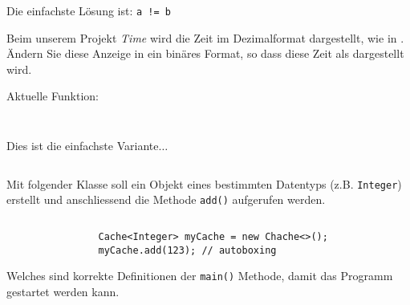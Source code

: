 \documentclass[12pt,a4paper]{exam}
\begin{document}
\begin{questions}
        \ifprintanswers
        \begin{solution}
            Die einfachste Lösung ist:
            \texttt{a != b}
        \end{solution}
        \else\makeemptybox{2in}
        \fi


        \question[10] Beim unserem Projekt \emph{Time} wird die Zeit im Dezimalformat
        dargestellt, wie in . Ändern Sie diese Anzeige in ein binäres
        Format, so dass diese Zeit als  dargestellt wird.

        Aktuelle Funktion:

        \inputminted[autogobble,firstline=75,lastline=78]
        {java}{../java/time/Display.java}

        \inputminted[autogobble,firstline=41,lastline=47]
        {java}{../java/time/NumberDisplay.java}


        \addpoints

        \ifprintanswers
        \begin{solution}
            Dies ist die einfachste Variante$\ldots$

            \inputminted[autogobble,firstline=49,lastline=51]
            {java}{../java/time/NumberDisplay.java}
        \end{solution}
        \else\makeemptybox{3in}
        \fi


        \question[10]
        Mit folgender Klasse soll ein Objekt eines bestimmten Datentyps (z.B.
        \texttt{Integer}) erstellt und anschliessend die Methode
        \texttt{add()} aufgerufen werden.
        \inputminted[autogobble,linenos,firstline=3]{java}{../java/generics/Cache.java}

        \ifprintanswers
        \begin{solution}
            \begin{verbatim}
                Cache<Integer> myCache = new Chache<>();
                myCache.add(123); // autoboxing
            \end{verbatim}
        \end{solution}
        \else\makeemptybox{3in}
        \fi

        \newpage

        \checkboxchar{$\Box$} %
        \question[4] Welches sind korrekte Definitionen der \texttt{main()} Methode,
        damit das Programm gestartet werden kann.


\end{questions}
\end{document}
